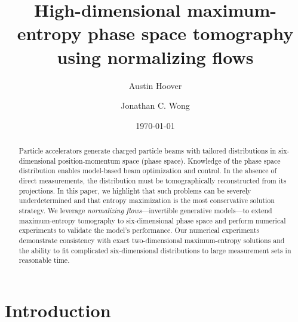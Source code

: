 \documentclass[%
    reprint,
    twocolumn,
    nofootinbib,
    amsmath,
    amssymb,
    aps,
    prstab,
]{revtex4-2}
\begin{document}
\title{High-dimensional maximum-entropy phase space tomography using normalizing flows}

\author{Austin Hoover}%

\author{Jonathan C. Wong}%



\date{\today}



\begin{abstract}

Particle accelerators generate charged particle beams with tailored distributions in six-dimensional position-momentum space (phase space). Knowledge of the phase space distribution enables model-based beam optimization and control. In the absence of direct measurements, the distribution must be tomographically reconstructed from its projections. In this paper, we highlight that such problems can be severely underdetermined and that entropy maximization is the most conservative solution strategy. We leverage \textit{normalizing flows}---invertible generative models---to extend maximum-entropy tomography to six-dimensional phase space and perform numerical experiments to validate the model's performance. Our numerical experiments demonstrate consistency with exact two-dimensional maximum-entropy solutions and the ability to fit complicated six-dimensional distributions to large measurement sets in reasonable time.
\end{abstract}


\maketitle


%   
\section{Introduction}\label{sec:introduction}
\end{document}
